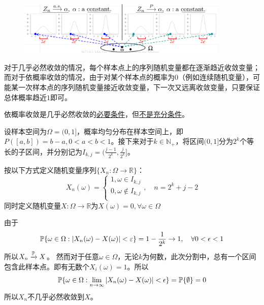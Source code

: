 \begin{figure}[h]
    \centering
    \includegraphics[width=0.9\textwidth]{image/converge1.png}
\end{figure}

对于几乎必然收敛的情况，每个样本点上的序列随机变量都在逐渐趋近收敛变量；而对于依概率收敛的情况，由于对某个样本点的概率为0（例如连续随机变量），可能某一次样本点的序列随机变量接近收敛变量，下一次又远离收敛变量，只要保证总体概率趋近$1$即可。

\begin{proposition}
    依概率收敛是几乎必然收敛的\underline{必要条件}，但\underline{不是充分条件}。
\end{proposition}

\begin{example}[依概率收敛而不几乎必然收敛]
    设样本空间为$\Omega =(0,1]$，概率均匀分布在样本空间上，即$P([a,b])=b-a,0<a<b<1$。接下来对于$k \in \mathbb{N}_+$，将区间$(0,1]$分为$2^{k}$个等长的子区间，并分别记为$I_{k,j}=(\frac{j-1}{2^k},\frac{j}{2^k}]$。

    按以下方式定义随机变量序列$\{ X_n: \Omega \to \mathbb{R} \}$：
    \[ X_n(\omega)=\begin{cases}
            1, \omega \in I_{k,j}    \\
            0, \omega \notin I_{k,j} \\
        \end{cases} ,\quad n = 2^k+j-2\]
    同时定义随机变量$X: \Omega \to \mathbb{R}$为$X(\omega)=0,\forall \omega \in \Omega$

    由于
    \[ \P\{\omega \in \Omega: \abs{X_n(\omega) - X(\omega)}<\e\}=1-\frac1{2^k} \to 1 ,\quad \forall 0<\epsilon<1 \]
    所以$X_n \xrightarrow{\P} X$。
    然而对于任意$\omega \in \Omega$，无论$k$为何数，此次分割中，总有一个区间包含此样本点。即有无数个$X_i(\omega) = 1$。所以
    \[ \P\{ \omega \in \Omega: \lim_{n \to \infty}\abs{ X_n(\omega) - X(\omega)} < \epsilon \} =\P\{\emptyset \}=0 \]
    所以$X_n$不几乎必然收敛到$X$。
\end{example}

